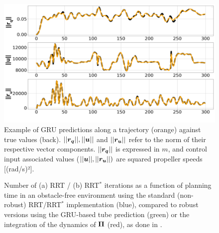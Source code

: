 \begin{figure} [t]
    \centering
    \includegraphics[width=0.8\linewidth]{figures/robust_accurate/PredNorm.png} 
    \caption{Example of GRU predictions along a trajectory (orange) against true values (back). $||\boldsymbol{r_q}||, ||\boldsymbol{u}||$ and $||\boldsymbol{r_u}||$ refer to the norm of their respective vector components. $||\boldsymbol{r_q}||$ is expressed in $m$, and control input associated values ($||\boldsymbol{u}||,||\boldsymbol{r_u}||)$ are squared propeller speeds [(rad/s)²].}%
    \label{fig: NN pred}%
\end{figure}

\begin{figure} [!t]
    \centering
    \caption{Number of (a) RRT / (b) RRT$^*$ iterations as a function of planning time in an obstacle-free environment using the standard (non-robust) RRT/RRT$^*$ implementation (blue), compared to robust versions using the GRU-based tube prediction (green) or the integration of the dynamics of $\boldsymbol{\Pi}$ (red), as done in \cite{cSAMP}.}%
    \label{fig: NNTime}%
\end{figure}

